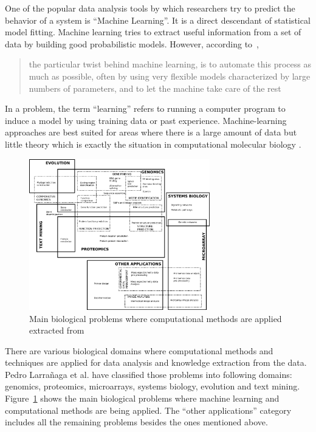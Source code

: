 One of the popular data analysis tools by which researchers try to predict the behavior of a system is “Machine Learning”. 
It is a direct descendant of statistical model fitting. 
Machine learning tries to extract useful information from a set of data by building good probabilistic models. However,  
according to~\cite{baldi_bioinformatics_2001},
\begin{quote}
the particular twist behind machine learning, is to automate this process as much as possible, often by using 
very flexible models characterized by large numbers of parameters, and to let the machine take care of the rest
\end{quote}
In a problem, the term “learning” refers to running a computer program to induce a model by using training data or 
past experience.  Machine-learning approaches are best suited for areas where there is a large amount of data 
but little theory which is exactly the situation in computational molecular biology \cite{chauvin_backpropagation_1995}.

\begin{figure}[ht]
    \centering
    \includegraphics[width=0.70\textwidth]{figures/06BioinformaticsTopics.jpg}
    \caption{Main biological problems where computational methods are applied 
    extracted from~\cite{larranaga_machine_2006}}
    \label{fig:bioinformaticsTopics}
\end{figure}

There are various biological domains where computational methods and techniques are applied for data analysis and knowledge 
extraction from the data. Pedro Larrañaga et al. \cite{larranaga_machine_2006} have classified those problems into 
following domains: genomics, proteomics, microarrays, systems biology, evolution and text mining. 
Figure~\ref{fig:bioinformaticsTopics} shows the main biological problems where machine learning and computational methods 
are being applied. The “other applications” category includes all the remaining problems besides the ones mentioned above.

